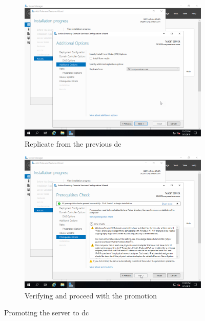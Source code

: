 \begin{figure}[!htb]\ContinuedFloat
	\begin{subfigure}{0.5\textwidth}
		\captionsetup{width=0.8\linewidth}
		\includegraphics[width=0.9\linewidth]{img/Methodologie/Migration21.png}
		\centering
		\caption{Replicate from the previous \acrshort{dc}}
	\end{subfigure}
	\begin{subfigure}{0.5\textwidth}
		\captionsetup{width=0.8\linewidth}
		\includegraphics[width=0.9\linewidth]{img/Methodologie/Migration22.png} 
		\centering	
		\caption{Verifying and proceed with the promotion}
	\end{subfigure}
	\caption[\acrshort{dc} promotion]{Promoting the server to \acrshort{dc}}
	\label{fig:Promotion}
\end{figure}
\clearpage
